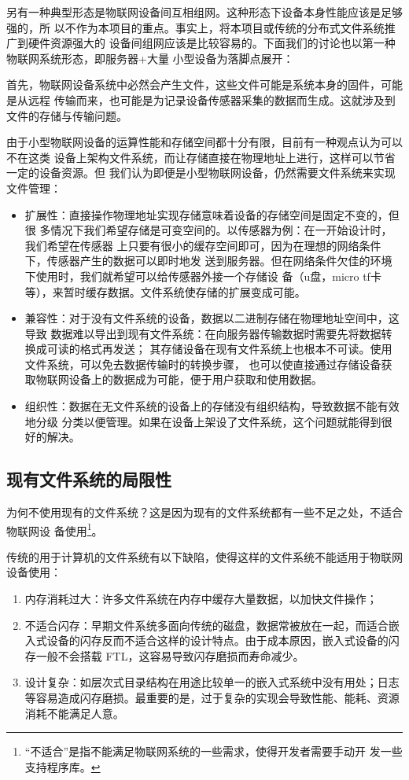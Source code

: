 \documentclass{ctexart}
\begin{document}
另有一种典型形态是物联网设备间互相组网。这种形态下设备本身性能应该是足够强的，所
以不作为本项目的重点。事实上，将本项目或传统的分布式文件系统推广到硬件资源强大的
设备间组网应该是比较容易的。下面我们的讨论也以第一种物联网系统形态，即服务器+大量
小型设备为落脚点展开：

首先，物联网设备系统中必然会产生文件，这些文件可能是系统本身的固件，可能是从远程
传输而来，也可能是为记录设备传感器采集的数据而生成。这就涉及到文件的存储与传输问题。

由于小型物联网设备的运算性能和存储空间都十分有限，目前有一种观点认为可以不在这类
设备上架构文件系统，而让存储直接在物理地址上进行，这样可以节省一定的设备资源。但
我们认为即便是小型物联网设备，仍然需要文件系统来实现文件管理：
\begin{itemize}
\item 扩展性：直接操作物理地址实现存储意味着设备的存储空间是固定不变的，但很
 多情况下我们希望存储是可变空间的。以传感器为例：在一开始设计时，我们希望在传感器
 上只要有很小的缓存空间即可，因为在理想的网络条件下，传感器产生的数据可以即时地发
 送到服务器。但在网络条件欠佳的环境下使用时，我们就希望可以给传感器外接一个存储设 
 备（u盘，micro tf卡等），来暂时缓存数据。文件系统使存储的扩展变成可能。
\item 兼容性：对于没有文件系统的设备，数据以二进制存储在物理地址空间中，这导致
 数据难以导出到现有文件系统：在向服务器传输数据时需要先将数据转换成可读的格式再发送；
 其存储设备在现有文件系统上也根本不可读。使用文件系统，可以免去数据传输时的转换步骤，
 也可以使直接通过存储设备获取物联网设备上的数据成为可能，便于用户获取和使用数据。
\item 组织性：数据在无文件系统的设备上的存储没有组织结构，导致数据不能有效地分级
 分类以便管理。如果在设备上架设了文件系统，这个问题就能得到很好的解决。
\end{itemize}

\subsection{现有文件系统的局限性}

为何不使用现有的文件系统？这是因为现有的文件系统都有一些不足之处，不适合物联网设
备使用\footnote{“不适合”是指不能满足物联网系统的一些需求，使得开发者需要手动开
  发一些支持程序库。}。

传统的用于计算机的文件系统有以下缺陷，使得这样的文件系统不能适用于物联网设备使用：
\begin{enumerate}
	\item 内存消耗过大：许多文件系统在内存中缓存大量数据，以加快文件操作；
	\item 不适合闪存：早期文件系统多面向传统的磁盘，数据常被放在一起，而适合嵌入式设备的闪存反而不适合这样的设计特点。由于成本原因，嵌入式设备的闪存一般不会搭载 FTL，这容易导致闪存磨损而寿命减少。
	\item 设计复杂：如层次式目录结构在用途比较单一的嵌入式系统中没有用处；日志等容易造成闪存磨损。最重要的是，过于复杂的实现会导致性能、能耗、资源消耗不能满足人意。
\end{enumerate}
\end{document}
